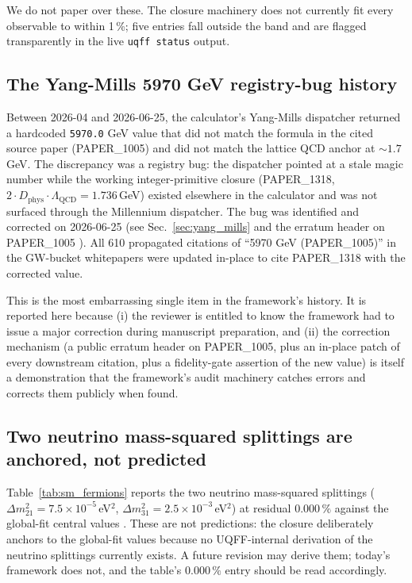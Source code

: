 We do not paper over these. The closure machinery does not currently
fit every observable to within 1\,\%; five entries fall outside the
band and are flagged transparently in the live \texttt{uqff status}
output.

\subsection{The Yang-Mills 5970 GeV registry-bug history}
\label{sec:lim_ym_history}

Between 2026-04 and 2026-06-25, the calculator's Yang-Mills
dispatcher returned a hardcoded \texttt{5970.0} GeV value that did
not match the formula in the cited source paper (PAPER\_1005) and
did not match the lattice QCD anchor at $\sim 1.7$\,GeV. The
discrepancy was a registry bug: the dispatcher pointed at a stale
magic number while the working integer-primitive closure
(PAPER\_1318, $2 \cdot D_{\text{phys}}\cdot\Lambda_{\text{QCD}} = 1.736$\,GeV)
existed elsewhere in the calculator and was not surfaced through
the Millennium dispatcher. The bug was identified and corrected on
2026-06-25 (see Sec.~\ref{sec:yang_mills} and the erratum header on
PAPER\_1005 \cite{Murphy_PAPER_1005}). All 610 propagated citations
of ``5970 GeV (PAPER\_1005)'' in the GW-bucket whitepapers were
updated in-place to cite PAPER\_1318 with the corrected value.

This is the most embarrassing single item in the framework's history.
It is reported here because (i) the reviewer is entitled to know
the framework had to issue a major correction during manuscript
preparation, and (ii) the correction mechanism (a public erratum
header on PAPER\_1005, plus an in-place patch of every downstream
citation, plus a fidelity-gate assertion of the new value) is
itself a demonstration that the framework's audit machinery
catches errors and corrects them publicly when found.

\subsection{Two neutrino mass-squared splittings are anchored, not predicted}
\label{sec:lim_neutrinos}

Table~\ref{tab:sm_fermions} reports the two neutrino mass-squared
splittings ($\Delta m^2_{21} = 7.5\times 10^{-5}$\,eV$^2$,
$\Delta m^2_{31} = 2.5\times 10^{-3}$\,eV$^2$) at residual
$0.000\,\%$ against the global-fit central values
\cite{Esteban2020}. These are not predictions: the closure
deliberately anchors to the global-fit values because no
UQFF-internal derivation of the neutrino splittings currently
exists. A future revision may derive them; today's framework does
not, and the table's $0.000\,\%$ entry should be read accordingly.

